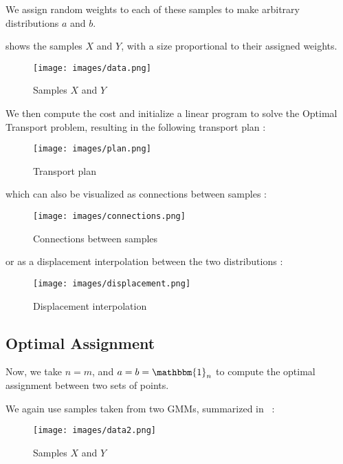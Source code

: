 \documentclass[a4paper,11pt]{article}
\newcommand{\1}{\mathbbm{1}}
\begin{document}
We assign random weights to each of these samples to make arbitrary distributions $a$ and $b$.

 shows the samples $X$ and $Y$, with a size proportional to their assigned weights.

\begin{figure}[H]
    \centering
    \texttt{[image: images/data.png]}
    \caption{Samples $X$ and $Y$}
    \label{fig:data}
\end{figure}

We then compute the cost and initialize a linear program to solve the Optimal Transport problem, resulting in the following transport plan :

\begin{figure}[H]
    \centering
    \texttt{[image: images/plan.png]}
    \caption{Transport plan}
    \label{fig:plan}
\end{figure}

which can also be visualized as connections between samples :

\begin{figure}[H]
    \centering
    \texttt{[image: images/connections.png]}
    \caption{Connections between samples}
    \label{fig:connections}
\end{figure}

or as a displacement interpolation between the two distributions :

\begin{figure}[H]
    \centering
    \texttt{[image: images/displacement.png]}
    \caption{Displacement interpolation}
    \label{fig:displacement}
\end{figure}

\subsection{Optimal Assignment}

Now, we take $n = m$, and $a = b = \1_n$ to compute the optimal assignment between two sets of points.

We again use samples taken from two GMMs, summarized in ~:

\begin{figure}[H]
    \centering
    \texttt{[image: images/data2.png]}
    \caption{Samples $X$ and $Y$}
    \label{fig:data2}
\end{figure}
\end{document}
